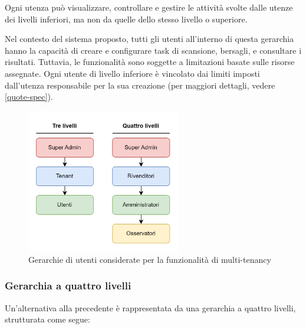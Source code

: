 Ogni utenza può visualizzare, controllare e gestire le attività svolte dalle utenze dei livelli inferiori, ma non da quelle dello stesso livello o superiore.

Nel contesto del sistema proposto, tutti gli utenti all'interno di questa gerarchia hanno la capacità di creare e configurare task di scansione, bersagli, e consultare i risultati. Tuttavia, le funzionalità sono soggette a limitazioni basate sulle risorse assegnate. Ogni utente di livello inferiore è vincolato dai limiti imposti dall'utenza responsabile per la sua creazione (per maggiori dettagli, vedere \ref{quote-spec}).

\begin{figure}[h]
    \centering
    \includegraphics[width=0.6\textwidth]{img/hierarchies.png}
    \caption{Gerarchie di utenti considerate per la funzionalità di multi-tenancy}
\end{figure}

\subsubsection{Gerarchia a quattro livelli}
\label{4-level}
Un'alternativa alla precedente è rappresentata da una gerarchia a quattro livelli, strutturata come segue:


